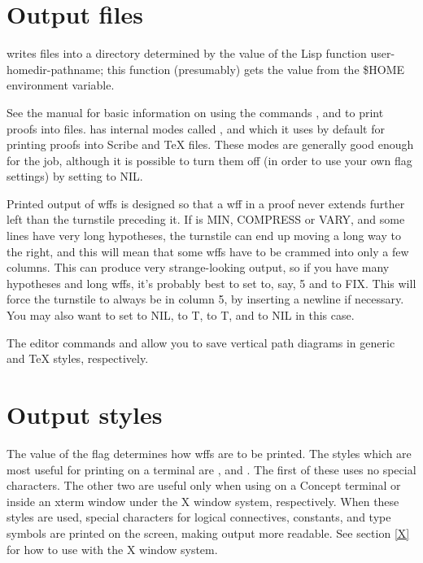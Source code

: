 


\section{Output files}

{\TPS} writes files into a directory determined by the value of the Lisp
function user-homedir-pathname; this function (presumably) gets the
value from the \$HOME environment variable.

See the {\ETPS} manual \cite{AndrewsTPS88b} for basic information on using the
commands ,  and
 to print proofs into files. {\TPS} has internal
modes called ,  and
 which it uses by default for printing proofs into
Scribe and TeX files. These modes are generally good enough for the job, although
it is possible to turn them off (in order to use your own flag settings)
by setting  to NIL.

Printed output of wffs is designed so that a wff in a proof never extends
further left than the turnstile preceding it. If 
is MIN, COMPRESS or VARY, and some lines have very long hypotheses, the
turnstile can end up moving a long way to the right, and this will mean
that some wffs have to be crammed into only a few columns. This can produce
very strange-looking output, so if you have many hypotheses and long wffs, it's probably best to set
 to, say, 5 and  to FIX.
This will force the turnstile to always be in column 5, by inserting a newline if necessary.
You may also want to set  to NIL,
 to T,  to T,
and  to NIL in this case.

The editor commands  and  allow you to save vertical
path diagrams in generic and TeX styles, respectively.

\section{Output styles}
The value of the flag  determines how wffs are to be printed.
The styles which are most useful for printing on a terminal are
,  and .
The first of these uses no special characters.
The other two are useful only when using {\TPS} on a Concept terminal or inside an
xterm window under the X window system, respectively.  When these styles are used,
special characters for
logical connectives, constants, and type symbols are printed on the screen,
making output more readable.  See section \ref{X} for how to use {\TPS}
with the X window system.

